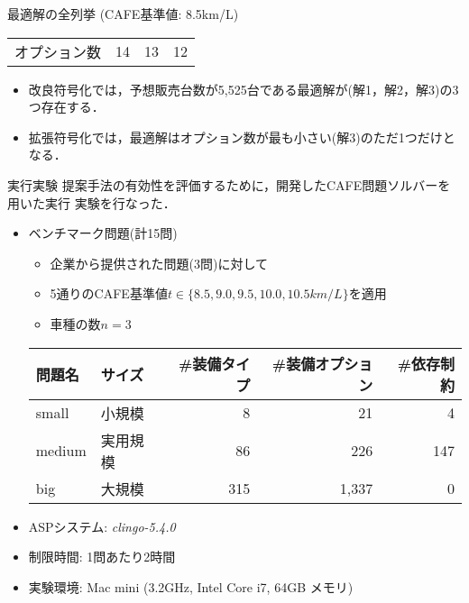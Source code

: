 \documentclass[dvipdfmx, 11pt]{beamer}
\begin{document}
\begin{frame}{最適解の全列挙 {\normalsize (CAFE基準値: 8.5km/L)}}
\begin{exampleblock}{}
\begin{tabular}{l|l|c|c|c||c|c|c||c|c|c}
    \multicolumn{2}{l|}{オプション数}  & \multicolumn{3}{c||}{14} & \multicolumn{3}{c||}{13}  &\multicolumn{3}{c}{12}\\ 
  \end{tabular}
 \end{exampleblock}
 \begin{itemize}
  \item 改良符号化では，予想販売台数が5,525台である最適解が(解1，解2，解3)の3つ存在する．
  \item 拡張符号化では，最適解はオプション数が最も小さい(解3)のただ1つだけとなる．
 \end{itemize}
\end{frame}
\begin{frame}{実行実験}
提案手法の有効性を評価するために，開発したCAFE問題ソルバーを用いた実行
実験を行なった．
\vfill
\begin{itemize}
\item ベンチマーク問題(計15問)
  \begin{itemize}
  \item 企業から提供された問題(3問)に対して
  \item 5通りのCAFE基準値$t\in\{8.5, 9.0, 9.5, 10.0, 10.5km/L\}$を適用
  \item 車種の数$n = 3$
  \end{itemize}
  \begin{exampleblock}\small
    \centering
    \begin{tabular}{ ll|r r r }
      問題名 & サイズ &  \#装備タイプ & \#装備オプション& \#依存制約\\ \hline
      small	 & 小規模   &   8 &   21  &   4	\\
      medium & 実用規模 &  86 &  226  & 147	\\
      big    & 大規模   & 315 & 1,337 &   0
    \end{tabular}
  \end{exampleblock}
\item ASPシステム: \textit{clingo-5.4.0}
\item 制限時間: 1問あたり2時間
\item 実験環境: Mac mini (3.2GHz, Intel Core i7, 64GB メモリ)
\end{itemize}
\end{frame}
\end{document}
